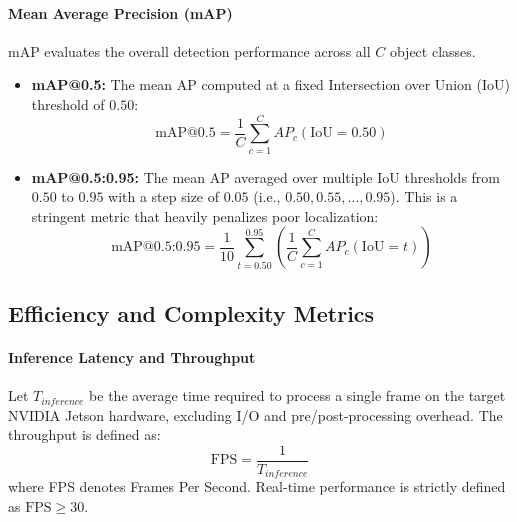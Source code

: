 \paragraph{Mean Average Precision (mAP)}
mAP evaluates the overall detection performance across all $C$ object classes. 
\begin{itemize}
    \item \textbf{mAP@0.5:} The mean AP computed at a fixed Intersection over Union (IoU) threshold of $0.50$:
    \begin{equation}
        \text{mAP@0.5} = \frac{1}{C} \sum_{c=1}^{C} AP_c(\text{IoU} = 0.50)
    \end{equation}
    \item \textbf{mAP@0.5:0.95:} The mean AP averaged over multiple IoU thresholds from $0.50$ to $0.95$ with a step size of $0.05$ (i.e., $0.50, 0.55, \dots, 0.95$). This is a stringent metric that heavily penalizes poor localization:
    \begin{equation}
        \text{mAP@0.5:0.95} = \frac{1}{10} \sum_{t=0.50}^{0.95} \left( \frac{1}{C} \sum_{c=1}^{C} AP_c(\text{IoU} = t) \right)
    \end{equation}
\end{itemize}

\subsection{Efficiency and Complexity Metrics}
\paragraph{Inference Latency and Throughput}
Let $T_{inference}$ be the average time required to process a single frame on the target NVIDIA Jetson hardware, excluding I/O and pre/post-processing overhead. The throughput is defined as:
\begin{equation}
    \text{FPS} = \frac{1}{T_{inference}}
\end{equation}
where FPS denotes Frames Per Second. Real-time performance is strictly defined as $\text{FPS} \geq 30$.

